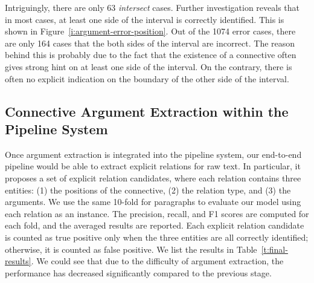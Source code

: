 

Intriguingly, there are only 63 \textit{intersect} cases. Further investigation
reveals that in most cases, at least one side of the interval is correctly
identified. This is shown in Figure~\ref{i:argument-error-position}. Out of
the 1074 error cases, there are only 164 cases that the both sides of the
interval are incorrect. The reason behind this is probably due to the fact that
the existence of a connective often gives strong hint on at least one side of
the interval. On the contrary, there is often no explicit indication on the boundary
of the other side of the interval.



\subsection{Connective Argument Extraction within the Pipeline System}

Once argument extraction is integrated into the pipeline system, our end-to-end
pipeline would be able to extract explicit relations for raw text. In particular,
it proposes a set of explicit relation candidates, where each relation contains
three entities: (1) the positions of the connective, (2) the relation type, and
(3) the arguments. We use the same 10-fold for paragraphs to evaluate our model
using each relation
as an instance. The precision, recall, and F1 scores are computed for each fold,
and the averaged results are reported. Each explicit relation candidate is
counted as true positive only when the three entities are all correctly
identified; otherwise, it is counted as false positive. We list the results
in Table~\ref{t:final-results}. We could see that due to the difficulty
of argument extraction, the performance has decreased significantly compared
to the previous stage.


